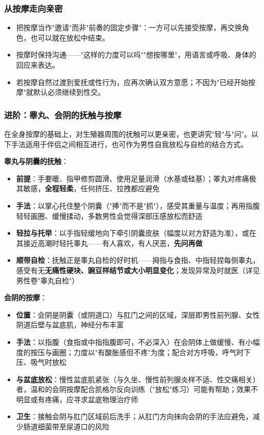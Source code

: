 \documentclass[12pt,UTF8]{ctexbook}
\begin{document}
\subsubsection{从按摩走向亲密}
\begin{itemize}
	\item 把按摩当作"邀请"而非"前奏的固定步骤"：一方可以先接受按摩，再交换角色，也可以就在放松中结束。
	\item 按摩时保持沟通——"这样的力度可以吗""想按哪里"，用语言或呼吸、身体的回应来表达。
	\item 若按摩自然过渡到爱抚或性行为，应再次确认双方意愿；不因为"已经开始按摩"就默认必须继续到性交。
\end{itemize}

\subsubsection{进阶：睾丸、会阴的抚触与按摩}

在全身按摩的基础上，对生殖器周围的抚触可以更亲密，也更讲究"轻"与"问"。以下手法适用于伴侣之间相互进行，也可作为男性自我放松与自检的结合方式。

\vspace{0.5em}
\noindent\textbf{睾丸与阴囊的抚触}：

\begin{itemize}
	\item \textbf{前提}：手要暖、指甲修剪圆滑、使用足量润滑（水基或硅基）；睪丸对疼痛极其敏感，\textbf{全程轻柔}，任何挤压、拉拽都应避免
	\item \textbf{手法}：以掌心托住整个阴囊（"捧"而不是"抓"），感受其重量与温度；再用指腹轻轻画圈、缓慢揉动，多数男性会觉得深部压感放松而舒适
	\item \textbf{轻拉与托举}：以手指轻缓地向下牵引阴囊皮肤（幅度以对方舒适为准），或在其接近高潮时轻托睾丸——有人喜欢，有人厌恶，\textbf{先问再做}
	\item \textbf{顺带自检}：抚触正是睾丸自检的好时机——拇指与食指、中指轻捏每侧睾丸，感受有无\textbf{无痛性硬块、豌豆样结节或大小明显变化}；发现异常及时就医（详见男性卷"睾丸自检"）
\end{itemize}

\vspace{0.5em}
\noindent\textbf{会阴的按摩}：

\begin{itemize}
	\item \textbf{位置}：会阴是阴囊（或阴道口）与肛门之间的区域，深层即男性前列腺、女性阴道后壁与盆底肌，神经分布丰富
	\item \textbf{手法}：以指腹（食指或中指指腹即可，不必深入）在会阴体上做缓慢、有小幅度的按压与画圈；力度以"有酸胀感但不疼"为度；配合对方呼吸，呼气时下压、吸气时放松
	\item \textbf{与盆底放松}：慢性盆底肌紧张（与久坐、慢性前列腺炎样不适、性交痛相关）者，温和的会阴按摩配合凯格尔反向训练（"放松"练习）可能有帮助；效果不明显或有疼痛，应寻求盆底物理治疗师
	\item \textbf{卫生}：接触会阴与肛门区域前后洗手；从肛门方向抹向会阴的手法应避免，减少肠道细菌带至尿道口的风险
\end{itemize}
\end{document}
